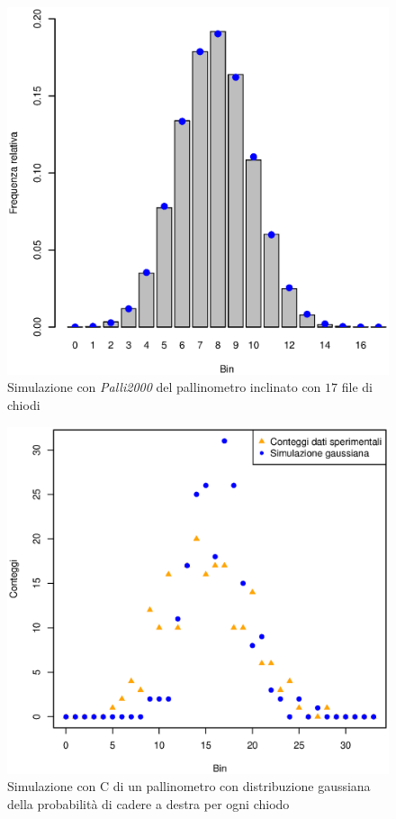 \documentclass[10pt,oneside,a4paper]{article}
\begin{document}
\begin{figure}[H]
\caption{Simulazione con \emph{Palli2000} del pallinometro inclinato con $17$ file di chiodi}
\label{fig:palli2000_inclinato_17}
\centering
\includegraphics[scale=0.5]{palli200_inclinato_3.eps}
\end{figure}

\begin{figure}[H]
\caption{Simulazione con C di un pallinometro con distribuzione gaussiana della probabilità di cadere a destra per ogni chiodo}
\label{}
\centering
\includegraphics[scale=0.5]{lollo.eps}
\end{figure}
\end{document}
